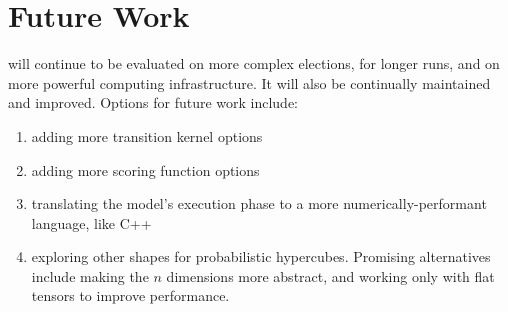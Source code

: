\section{Future Work}

 will continue to be evaluated on more complex elections, for longer runs, and on more powerful computing infrastructure. It will also be continually maintained and improved. Options for future work include:

\begin{enumerate}
  \item adding more transition kernel options
  \item adding more scoring function options
  \item translating the model's execution phase to a more numerically-performant language, like C++
  \item exploring other shapes for probabilistic hypercubes. Promising alternatives include making the $n$ dimensions more abstract, and working only with flat tensors to improve performance.
\end{enumerate}
